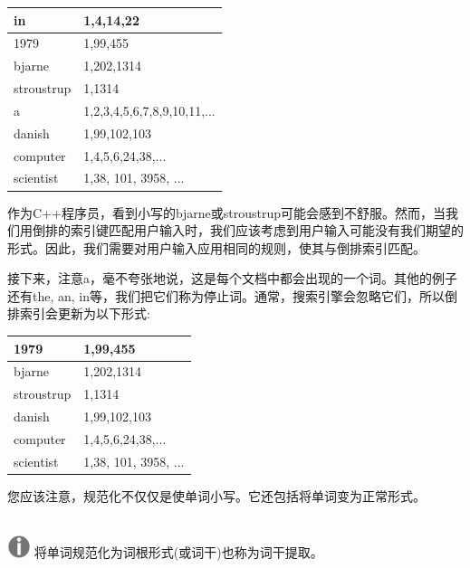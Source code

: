 \begin{table}[h]
	\begin{tabularx}{\textwidth}{|X|X|}
		\hline
		in & 1,4,14,22 \\
		\hline
		1979 & 1,99,455 \\
		\hline
		bjarne & 1,202,1314 \\
		\hline
		stroustrup & 1,1314 \\
		\hline
		a & 1,2,3,4,5,6,7,8,9,10,11,... \\
		\hline
		danish & 1,99,102,103 \\
		\hline
		computer & 1,4,5,6,24,38,... \\
		\hline
		scientist & 1,38, 101, 3958, ... \\
		\hline
	\end{tabularx}
\end{table}

作为C++程序员，看到小写的bjarne或stroustrup可能会感到不舒服。然而，当我们用倒排的索引键匹配用户输入时，我们应该考虑到用户输入可能没有我们期望的形式。因此，我们需要对用户输入应用相同的规则，使其与倒排索引匹配。 \par
接下来，注意a，毫不夸张地说，这是每个文档中都会出现的一个词。其他的例子还有the, an, in等，我们把它们称为停止词。通常，搜索引擎会忽略它们，所以倒排索引会更新为以下形式: \par

\begin{table}[h]
	\begin{tabularx}{\textwidth}{|X|X|}
		\hline
		1979 & 1,99,455 \\
		\hline
		bjarne & 1,202,1314 \\
		\hline
		stroustrup & 1,1314 \\
		\hline
		danish & 1,99,102,103 \\
		\hline
		computer & 1,4,5,6,24,38,... \\
		\hline
		scientist & 1,38, 101, 3958, ... \\
		\hline
	\end{tabularx}
\end{table}

您应该注意，规范化不仅仅是使单词小写。它还包括将单词变为正常形式。 \par

\hspace*{\fill} \\ %
\includegraphics[width=0.05\textwidth]{images/warn}
将单词规范化为词根形式(或词干)也称为词干提取。 \par
\noindent\textbf{}\ \par

